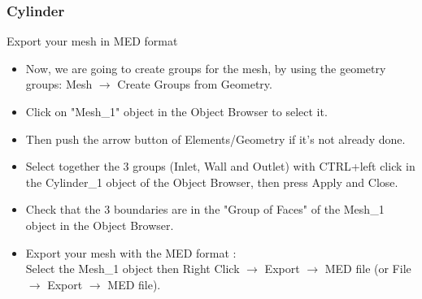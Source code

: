 \documentclass[10pt, hyperref={unicode=true,pdfusetitle, bookmarks=true,bookmarksnumbered=false,bookmarksopen=false, breaklinks=false,pdfborder={0 0 1},backref=true,colorlinks=true,linkcolor=darkblue,pageanchor}]{beamer}
\begin{document}
\begin{frame}
\frametitle{Cylinder}
\begin{block}{Export your mesh in MED format}

\begin{itemize}
\item Now, we are going to create groups for the mesh, by using the geometry groups: Mesh $\rightarrow$ Create Groups from Geometry.
\item Click on "Mesh\_1" object in the Object Browser to select it.
\item Then push the arrow button of Elements/Geometry if it's not already done.
\item Select together the 3 groups (Inlet, Wall and Outlet) with CTRL+left click in the Cylinder\_1 object of the Object Browser, then press Apply and Close.
\item Check that the 3 boundaries are in the "Group of Faces" of the Mesh\_1 object in the Object Browser.
\item Export your mesh with the MED format :\\
Select the Mesh\_1 object then Right Click $\rightarrow$ Export $\rightarrow$ MED file (or File $\rightarrow$ Export $\rightarrow$ MED file).
\end{itemize}

\end{block}
\end{frame}
\end{document}
